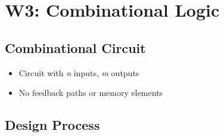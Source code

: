 \documentclass[a4paper]{article}
\begin{document}
\newpage
\section{W3: Combinational Logic}
\subsection{Combinational Circuit}
\begin{itemize}
    \item Circuit with \textit{n} inputs, \textit{m} outputs
    \item No feedback paths or memory elements
\end{itemize}

\subsection{Design Process}
\end{document}
